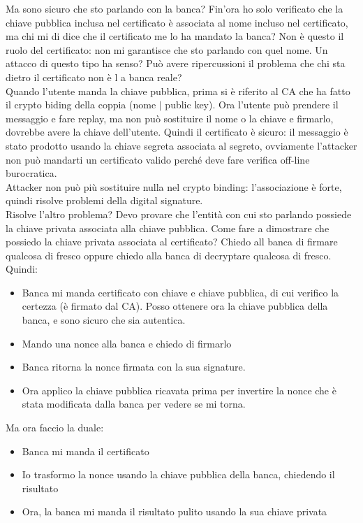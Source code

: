 \documentclass[16px]{article}
\begin{document}
Ma sono sicuro che sto parlando con la banca? Fin'ora ho solo verificato che la chiave pubblica inclusa nel certificato è associata al nome incluso nel certificato, ma chi mi di dice che il certificato me lo ha mandato la banca? Non è questo il ruolo del certificato: non mi garantisce che sto parlando con quel nome. Un attacco di questo tipo ha senso? Può avere ripercussioni il problema che chi sta dietro il certificato non è l a banca reale?\\ Quando l'utente manda la chiave pubblica, prima si è riferito al CA che ha fatto il crypto biding della coppia (nome $|$ public key). Ora l'utente può prendere il messaggio e fare replay, ma non può sostituire il nome o la chiave e firmarlo, dovrebbe avere la chiave dell'utente. Quindi il certificato è sicuro: il messaggio è stato prodotto usando la chiave segreta associata al segreto, ovviamente l'attacker non può mandarti un certificato valido perché deve fare verifica off-line burocratica.\\ Attacker non può più sostituire nulla nel crypto binding: l'associazione è forte, quindi risolve problemi della digital signature.\\ Risolve l'altro problema? Devo provare che l'entità con cui sto parlando possiede la chiave privata associata alla chiave pubblica. Come fare a dimostrare che possiedo la chiave privata associata al certificato? Chiedo all banca di firmare qualcosa di fresco oppure chiedo alla banca di decryptare qualcosa di fresco. Quindi:
\begin{itemize}
\item Banca mi manda certificato con chiave e chiave pubblica, di cui verifico la certezza (è firmato dal CA). Posso ottenere ora la chiave pubblica della banca, e sono sicuro  che sia autentica.
\item Mando una nonce alla banca e chiedo  di firmarlo
\item Banca ritorna la nonce firmata con la sua signature.
\item Ora applico la chiave pubblica ricavata prima per invertire la nonce che è stata modificata dalla banca per vedere se mi torna.
\end{itemize}
Ma ora faccio la duale:
\begin{itemize}
\item Banca mi manda il certificato
\item Io trasformo la nonce usando la chiave pubblica della banca, chiedendo il risultato
\item Ora, la banca mi manda il risultato pulito usando la sua chiave privata
\end{itemize}
\end{document}
